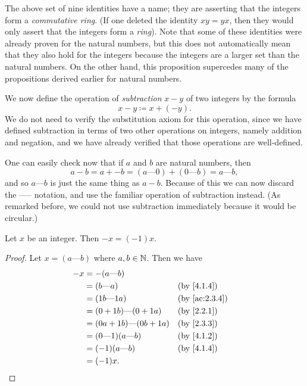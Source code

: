 \begin{rmk}\label{4.1.7}
  The above set of nine identities have a name; they are asserting that the integers form a \emph{commutative ring}.
  (If one deleted the identity \(xy = yx\), then they would only assert that the integers form a \emph{ring}).
  Note that some of these identities were already proven for the natural numbers, but this does not automatically mean that they also hold for the integers because the integers are a larger set than the natural numbers.
  On the other hand, this proposition supercedes many of the propositions derived earlier for natural numbers.
\end{rmk}

\begin{note}
  We now define the operation of \emph{subtraction} \(x - y\) of two integers by the formula
  \[
    x - y \coloneqq x + (-y).
  \]
  We do not need to verify the substitution axiom for this operation, since we have defined subtraction in terms of two other operations on integers, namely addition and negation, and we have already verified that those operations are well-defined.
\end{note}

\begin{note}
  One can easily check now that if \(a\) and \(b\) are natural numbers, then
  \[
    a - b = a + -b = (a \text{---} 0) + (0 \text{---} b) = a \text{---} b,
  \]
  and so \(a \text{---} b\) is just the same thing as \(a - b\).
  Because of this we can now discard the ----- notation, and use the familiar operation of subtraction instead.
  (As remarked before, we could not use subtraction immediately because it would be circular.)
\end{note}

\begin{ac}\label{ac:4.1.3}
  Let \(x\) be an integer.
  Then \(-x = (-1)x\).
\end{ac}

\begin{proof}
  Let \(x = (a \text{---} b)\) where \(a, b \in \mathbb{N}\).
  Then we have
  \begin{align*}
    -x & = -(a \text{---} b)                                                 \\
       & = (b \text{---} a)                 &  & \by{4.1.4}                  \\
       & = (1b \text{---} 1a)               &  & \text{(by \cref{ac:2.3.4})} \\
       & = (0 + 1b) \text{---} (0 + 1a)     &  & \by{2.2.1}                  \\
       & = (0a + 1b) \text{---} (0b + 1a)   &  & \by{2.3.3}                  \\
       & = (0 \text{---} 1)(a \text{---} b) &  & \by{4.1.2}                  \\
       & = (-1)(a \text{---} b)             &  & \by{4.1.4}                  \\
       & = (-1)x.
  \end{align*}
\end{proof}

